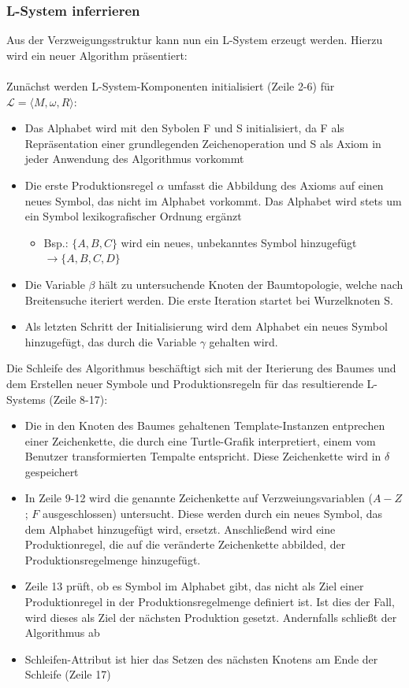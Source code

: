 \subsubsection*{L-System inferrieren}
Aus der Verzweigungsstruktur kann nun ein L-System erzeugt werden.
Hierzu wird ein neuer Algorithm präsentiert:\\~\\
Zunächst werden L-System-Komponenten initialisiert (Zeile 2-6) für $\mathcal{L}=\langle M,\omega,R \rangle$:
\begin{itemize}
    \item Das Alphabet wird mit den Sybolen F und S initialisiert, da F als Repräsentation einer grundlegenden
    Zeichenoperation und S als Axiom in jeder Anwendung des Algorithmus vorkommt
    \item Die erste Produktionsregel $\alpha$ umfasst die Abbildung des Axioms auf einen neues Symbol, das nicht im Alphabet
    vorkommt. Das Alphabet wird stets um ein Symbol lexikografischer Ordnung ergänzt
    \begin{itemize}
        \item Bsp.: $\{A,B,C\}$ wird ein neues, unbekanntes Symbol hinzugefügt $\rightarrow \{A,B,C,D\}$
    \end{itemize}
    \item Die Variable $\beta$ hält zu untersuchende Knoten der Baumtopologie, welche nach Breitensuche iteriert werden.
    Die erste Iteration startet bei Wurzelknoten S.
    \item Als letzten Schritt der Initialisierung wird dem Alphabet ein neues Symbol hinzugefügt, das durch die Variable
    $\gamma$ gehalten wird.
\end{itemize}
Die Schleife des Algorithmus beschäftigt sich mit der Iterierung des Baumes und dem Erstellen neuer Symbole und
Produktionsregeln für das resultierende L-Systems (Zeile 8-17):
\begin{itemize}
    \item Die in den Knoten des Baumes gehaltenen Template-Instanzen entprechen einer Zeichenkette, die durch eine
    Turtle-Grafik interpretiert, einem vom Benutzer transformierten Tempalte entspricht. Diese Zeichenkette wird in
    $\delta$ gespeichert
    \item In Zeile 9-12 wird die genannte Zeichenkette auf Verzweiungsvariablen ($A-Z$; $F$ ausgeschlossen) untersucht.
    Diese werden durch ein neues Symbol, das dem Alphabet hinzugefügt wird, ersetzt. Anschließend wird eine Produktionregel,
    die auf die veränderte Zeichenkette abbilded, der Produktionsregelmenge hinzugefügt.
    \item Zeile 13 prüft, ob es Symbol im Alphabet gibt, das nicht als Ziel einer Produktionregel in der Produktionsregelmenge
    definiert ist. Ist dies der Fall, wird dieses als Ziel der nächsten Produktion gesetzt. Andernfalls schließt der
    Algorithmus ab
    \item Schleifen-Attribut ist hier das Setzen des nächsten Knotens am Ende der Schleife (Zeile 17)
\end{itemize}

